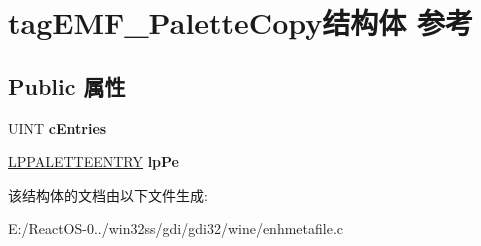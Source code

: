 \hypertarget{structtag_e_m_f___palette_copy}{}\section{tag\+E\+M\+F\+\_\+\+Palette\+Copy结构体 参考}
\label{structtag_e_m_f___palette_copy}
\subsection*{Public 属性}
\begin{DoxyCompactItemize}
\item 
\mbox{\label{structtag_e_m_f___palette_copy_a191b306df7f267549384369f034cfa1e}} 
U\+I\+NT {\bfseries c\+Entries}
\item 
\mbox{\label{structtag_e_m_f___palette_copy_a5b155499c4eac31d7a979b94e2590fb3}} 
\hyperlink{structtag_p_a_l_e_t_t_e_e_n_t_r_y}{L\+P\+P\+A\+L\+E\+T\+T\+E\+E\+N\+T\+RY} {\bfseries lp\+Pe}
\end{DoxyCompactItemize}


该结构体的文档由以下文件生成\+:\begin{DoxyCompactItemize}
\item 
E\+:/\+React\+O\+S-\/0../win32ss/gdi/gdi32/wine/enhmetafile.\+c\end{DoxyCompactItemize}
